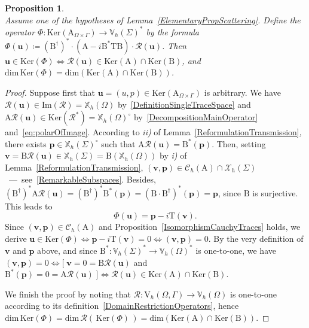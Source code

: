 \documentclass[a4paper,11pt]{article}
\newcommand{\mrm}{\mathrm}
\newcommand{\mA}{\mathrm{A}}
\newcommand{\mB}{\mathrm{B}}
\newcommand{\mT}{\mathrm{T}}
\newcommand{\mbV}{\mathbb{V}}
\newcommand{\mbX}{\mathbb{X}}
\newcommand{\Vh}{\mathrm{V}_{h}}
\newcommand{\bp}{\boldsymbol{p}}
\newcommand{\bu}{\boldsymbol{u}}
\newcommand{\bv}{\boldsymbol{v}}
\newtheorem{prop}[defn]{Proposition}
\begin{document}
\begin{prop}\label{IsomorphismKernels1}\quad\\
  Assume one of the hypotheses of Lemma~\ref{ElementaryPropScattering}. Define the operator $\Phi\colon 
  \mrm{Ker}(\mA_{\Omega\times\Gamma})\to \mbV_h(\Sigma)^*$ by the formula
  $\Phi(\bu) \coloneq (\mB^{\dagger})^*\cdot(\mA-i\mB^*\mT\mB)\cdot\mathcal{R}(\bu)$.
  Then $\bu\in \mrm{Ker}(\Phi)\iff\mathcal{R}(\bu)\in \mrm{Ker}(\mA)\cap \mrm{Ker}(\mB)$, 
  and $\mrm{dim}\,\mrm{Ker}(\Phi) = \mrm{dim}(\mrm{Ker}(\mA)\cap \mrm{Ker}(\mB))$.
\end{prop}
\begin{proof}
Suppose first that $\bu = (u,p)\in \mrm{Ker}(\mA_{\Omega\times\Gamma})$ is arbitrary.
We have $\mathcal{R}(\bu)\in \mrm{Im}(\mathcal{R}) = \mbX_h(\Omega)$ by~\eqref{DefinitionSingleTraceSpace} and $\mA\mathcal{R}(\bu)\in 
\mrm{Ker}(\mathcal{R}^*) = \mbX_h(\Omega)^{\circ}$ by~\eqref{DecompositionMainOperator} and~\eqref{eq:polarOfImage}. According to \textit{ii)} of Lemma~\ref{ReformulationTransmission}, there exists $\bp\in
\mbX_h(\Sigma)^{\circ}$ such that $\mA\mathcal{R}(\bu) = \mB^{*}(\bp)$. 
Then, setting $\bv = \mB\mathcal{R}(\bu)\in \mbX_h(\Sigma) =
\mB(\mbX_h(\Omega))$ by \textit{i)} of Lemma~\ref{ReformulationTransmission}, $(\bv,\bp)\in
\mathscr{C}_h(\mA)\cap \mathscr{X}_h(\Sigma)$~---~see~\eqref{RemarkableSubspaces}. Besides, 
$(\mB^{\dagger})^*\mA\mathcal{R}(\bu) = (\mB^{\dagger})^*\mB^{*}(\bp)
= (\mB\cdot\mB^{\dagger})^{*}(\bp) = \bp$, since \(\mB\) is surjective. This leads to
\begin{equation}\label{IdentitePhiIntermediaire}
  \Phi(\bu) = \bp-i\mT(\bv).
\end{equation}
Since $(\bv,\bp)\in\mathscr{C}_h(\mA)$ and Proposition~\ref{IsomorphismCauchyTraces} holds, we derive $\bu\in \mrm{Ker}(\Phi)\iff \bp-i\mT(\bv) = 0\iff (\bv,\bp) =
0$. By the very definition of $\bv$ and
$\bp$ above, and since $\mB^*\colon \mbV_h(\Sigma)^*\to \mbV_h(\Omega)^*$ is
one-to-one, we have $ (\bv,\bp) = 0 \iff \lbrack\;\bv = 0 =
\mB\mathcal{R}(\bu)$ and $ \mB^{*}(\bp ) = 0 =
\mA\mathcal{R}(\bu)\;\rbrack \iff \mathcal{R}(\bu)\in
\mrm{Ker}(\mA)\cap \mrm{Ker}(\mB)$.

We finish the proof by noting that $\mathcal{R}\colon \Vh(\Omega,\Gamma)\to
\mbV_h(\Omega)$ is one-to-one according to its definition~\eqref{DomainRestrictionOperators}, hence $\mrm{dim}\,\mrm{Ker}(\Phi)
= \mrm{dim}\,\mathcal{R}(\,\mrm{Ker}(\Phi)\,) = \mrm{dim}(\mrm{Ker}(\mA)\cap
\mrm{Ker}(\mB))$. 
\end{proof}
\end{document}
